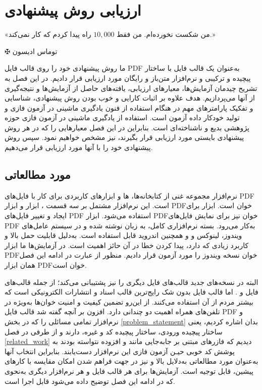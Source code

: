 
\chapter{ارزیابی روش پیشنهادی}\label{ch:5}
\thispagestyle{empty}

\epigraph{
«من شکست نخورده‌ام. من فقط $10,000$ راه پیدا کردم که کار نمی‌کند.»
}
{$ \maltese $ {\large توماس ادیسون}}


\noindent
ما روش پیشنهادی خود را روی قالب فایل \gls{PDF} به‌عنوان یک قالب فایل با ساختار پیچیده و ترکیبی و نرم‌افزار متن‌باز و رایگان
  \cite{MuPDF2018}
 مورد ارزیابی قرار دادیم. در این فصل به تشریح چیدمان آزمایش‌ها، معیارهای ارزیابی، یافته‌های حاصل از آزمایش‌ها و نتیجه‌گیری‌‌ از آنها می‌پردازیم. هدف علاوه بر اثبات کارایی و خوب بودن روش پیشنهادی، شناسایی و تفکیک پارامترهای مهم در هنگام استفاده از فنون یادگیری ماشینی در آزمون فازی و تولید خودکار داده آزمون است. استفاده از یادگیری ماشینی در آزمون فازی حوزه پژوهشی بدیع و ناشناخته‌ای است.  بنابراین در این فصل معیارهایی را که در هر روش پیشنهادی بایستی مورد ارزیابی قرار بگیرند، نیز مشخص خواهیم نمود. سپس روش پیشنهادی خود را با آنها مورد ارزیابی قرار می‌دهیم. 


\section{مورد مطالعاتی}
  نرم‌افزار
  \cite{MuPDF2018}
 مجموعه غنی از کتابخانه‌ها، ها و ابزارهای کاربردی برای کار با فایل‌های \gls{PDF} است. این نرم‌افزار مشتمل بر سه قسمت ، ابزار  و ابزار \gls{PDF}خوان است. ابزار  برای ایجاد و تغییر فایل‌های \gls{PDF} استفاده می‌شود. ابزار \gls{PDF}خوان نیز برای نمایش فایل‌های \gls{PDF} به‌کار می‌رود. بسته نرم‌افزاری کامل، به زبان  نوشته شده و در سیستم عامل‌های ویندوز، لینوکس و  و همچنین اندروید قابل استفاده است. به‌دلیل قابلیت حمل بالا و کاربرد زیادی که دارد، پیدا کردن خطا در آن حائز اهمیت است. در آزمایش‌ها ما ابزار \gls{PDF}خوان نسخه ویندوز را مورد آزمون قرار دادیم. منظور از عبارت  در ادامه این فصل همان ابزار \gls{PDF}خوان است.
 
  
  البته در نسخه‌های جدید قالب‌های فایل دیگری را نیز پشتیبانی می‌کند؛ از جمله قالب‌های  فایل  و . اما قالب فایل  بدون شک رایج‌ترین قالب اسناد و انتشارات الکترونیکی است که بیشتر مردم از آن استفاده می‌کنند. از این‌رو تضمین کیفیت و امنیت خوان‌ها به‌ویژه در تلفن‌های همراه اهمیت دو چندانی دارد. افزون بر آنچه گفته شد قالب فایل \gls{PDF} و نرم‌افزار  تمامی مسائلی را که در بخش \ref{problem_statement} بدان اشاره کردیم، یعنی ساختار پیچیده ورودی، ساختار پیچیده کد و غیره، دارند و از طرفی در فصل \ref{related_work} دیدیم که فازرهای مبتنی بر جابه‌جایی مانند   و افزوده نتواسته بودند به پوشش کد خوبی حیـن آزمون فازی این نرم‌افزار دست‌یابند. بنابراین انتخاب آنها به‌عنوان مورد مطالعاتی به‌دلایل بالا و نیز در جهت فراهم شدن امکان مقایسه با کارهای پیشین، قابل توجیه است. آزمایش‌ها برای هر قالب فایل و هر نرم‌افزار دیگری به‌نحوی که در ادامه این فصل توضیح داده می‌شود قابل اجرا است. 
  
